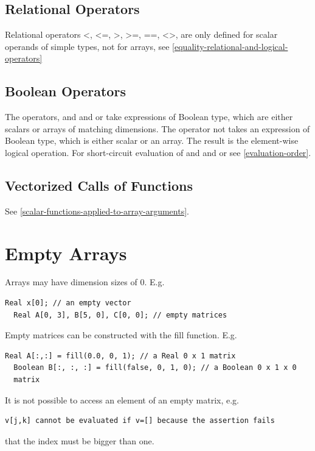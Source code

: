 \documentclass[10pt,a4paper]{report}
\def\doublelabel#1{\label{#1}\hypertarget{#1}{}}
\begin{document}
\subsection{Relational Operators}\doublelabel{relational-operators}

Relational operators \textless{}, \textless{}=, \textgreater{},
\textgreater{}=, ==, \textless{}\textgreater{}, are only defined for
scalar operands of simple types, not for arrays, see \ref{equality-relational-and-logical-operators}

\subsection{Boolean Operators}\doublelabel{boolean-operators}

The operators, and and or take expressions of Boolean type, which are
either scalars or arrays of matching dimensions. The operator not takes
an expression of Boolean type, which is either scalar or an array. The
result is the element-wise logical operation. For short-circuit
evaluation of and and or see \ref{evaluation-order}.

\subsection{Vectorized Calls of Functions}\doublelabel{vectorized-calls-of-functions}

See \ref{scalar-functions-applied-to-array-arguments}.

\section{Empty Arrays}\doublelabel{empty-arrays}

Arrays may have dimension sizes of 0. E.g.

\begin{lstlisting}[language=modelica]
  Real x[0]; // an empty vector
  Real A[0, 3], B[5, 0], C[0, 0]; // empty matrices
\end{lstlisting}
Empty matrices can be constructed with the fill function. E.g.

\begin{lstlisting}[language=modelica]
  Real A[:,:] = fill(0.0, 0, 1); // a Real 0 x 1 matrix
  Boolean B[:, :, :] = fill(false, 0, 1, 0); // a Boolean 0 x 1 x 0
  matrix
\end{lstlisting}
It is not possible to access an element of an empty matrix, e.g.
\begin{lstlisting}[language=modelica]
  v[j,k] cannot be evaluated if v=[] because the assertion fails
\end{lstlisting}
that the index must be bigger than one.
\end{document}
